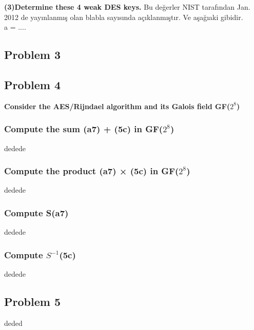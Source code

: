 \documentclass[11pt]{article}
\begin{document}
\subsubsection{}
\textbf{(3)Determine these 4 weak DES keys.}
Bu değerler NIST tarafından Jan. 2012 de yayınlanmış olan blabla sayısında açıklanmıştır. Ve aşağıaki gibidir.
\\a = ....


\subsection{Problem 3}

\subsection{Problem 4}
\textbf{Consider the AES/Rijndael algorithm and its Galois field GF($2^{8}$)}
\subsubsection{Compute the sum (a7) + (5c) in GF($2^{8}$)}
dedede
\subsubsection{Compute the product (a7) × (5c) in GF($2^{8}$)}
dedede
\subsubsection{Compute S(a7)}
dedede
\subsubsection{Compute $S^{-1}$(5c)}
dedede
\subsection{Problem 5}

deded
\end{document}
